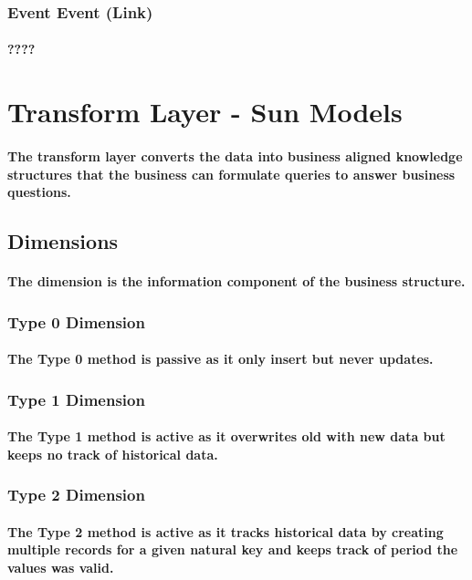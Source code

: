 \documentclass{acm_proc_article-sp}
\begin{document}
\subsubsection{Event Event (Link)}
\paragraph{????}
\pagebreak
\section{Transform Layer - Sun Models}
\paragraph{The transform layer converts the data into business aligned knowledge structures that the business can formulate queries to answer business questions.}
\subsection{Dimensions}
\paragraph{The dimension is the information component of the business structure.}
\subsubsection{Type 0 Dimension}
\paragraph{The Type 0 method is passive as it only insert but never updates.}
\subsubsection{Type 1 Dimension}
\paragraph{The Type 1 method is active as it overwrites old with new data but keeps no track of historical data.}
\subsubsection{Type 2 Dimension}
\paragraph{The Type 2 method is active as it tracks historical data by creating multiple records for a given natural key and keeps track of period the values was valid.}
\end{document}
